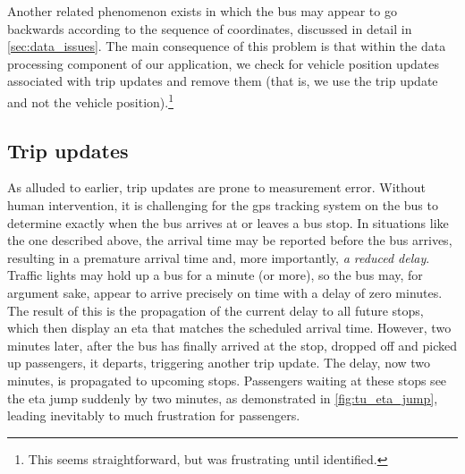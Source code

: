 Another related phenomenon exists in which the bus may appear to go backwards according to the sequence of \gps{} coordinates, discussed in detail in \cref{sec:data_issues}. The main consequence of this problem is that within the data processing component of our application, we check for vehicle position updates associated with trip updates and remove them (that is, we use the trip update and not the vehicle position).\footnote{This seems straightforward, but was frustrating until identified.}




\subsection{Trip updates}
\label{sec:tu_data}

As alluded to earlier, trip updates are prone to measurement error. Without human intervention, it is challenging for the \gls{gps} tracking system on the bus to determine exactly when the bus arrives at or leaves a bus stop. In situations like the one described above, the arrival time may be reported before the bus arrives, resulting in a premature arrival time and, more importantly, \emph{a reduced delay}. Traffic lights may hold up a bus for a minute (or more), so the bus may, for argument sake, appear to arrive precisely on time with a delay of zero minutes. The result of this is the propagation of the current delay to all future stops, which then display an \gls{eta} that matches the scheduled arrival time. However, two minutes later, after the bus has finally arrived at the stop, dropped off and picked up passengers, it departs, triggering another trip update. The delay, now two minutes, is propagated to upcoming stops. Passengers waiting at these stops see the \gls{eta} jump suddenly by two minutes, as demonstrated in \cref{fig:tu_eta_jump}, leading inevitably to much frustration for passengers.

